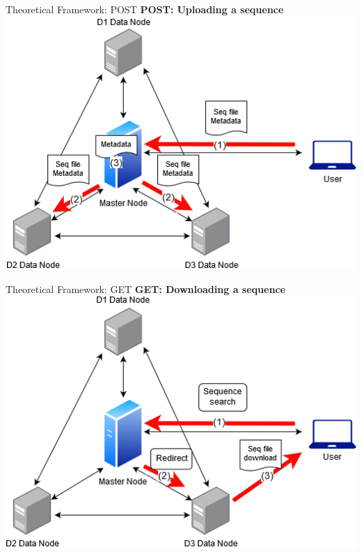 \documentclass{beamer}
\begin{document}
\begin{frame}{Theoretical Framework: POST}
\textbf{POST: Uploading a sequence} \\ \medskip
\centering
\includegraphics[scale=0.50]{images/thesis1-Page-3.png} 
\end{frame}

\begin{frame}{Theoretical Framework: GET}
\textbf{GET: Downloading a sequence} \\ \medskip
\centering
\includegraphics[scale=0.5]{images/thesis4.png}
\end{frame}
\end{document}
